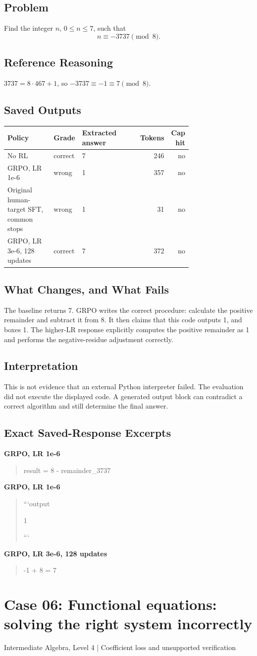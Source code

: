 \documentclass[10pt,letterpaper]{article}
\begin{document}
\subsection*{Problem}
Find the integer $n$, $0 \le n \le 7$, such that \[n \equiv -3737 \pmod{8}.\]
\subsection*{Reference Reasoning}
$3737=8\cdot467+1$, so $-3737\equiv-1\equiv7\pmod8$.
\subsection*{Saved Outputs}
\small\begin{longtable}{p{0.29\linewidth}p{0.10\linewidth}p{0.35\linewidth}rr}\toprule Policy & Grade & Extracted answer & Tokens & Cap hit\\\midrule
No RL & correct & 7 & 246 & no\\
GRPO, LR 1e-6 & wrong & 1 & 357 & no\\
Original human-target SFT, common stops & wrong & 1 & 31 & no\\
GRPO, LR 3e-6, 128 updates & correct & 7 & 372 & no\\
\bottomrule\end{longtable}\normalsize
\subsection*{What Changes, and What Fails}
The baseline returns 7. GRPO writes the correct procedure: calculate the positive remainder and subtract it from 8. It then claims that this code outputs 1, and boxes 1. The higher-LR response explicitly computes the positive remainder as 1 and performs the negative-residue adjustment correctly.
\subsection*{Interpretation}
This is not evidence that an external Python interpreter failed. The evaluation did not execute the displayed code. A generated output block can contradict a correct algorithm and still determine the final answer.
\subsection*{Exact Saved-Response Excerpts}
\textbf{GRPO, LR 1e-6}
\begin{quote}\small\raggedright result = 8 - remainder\_3737\end{quote}
\textbf{GRPO, LR 1e-6}
\begin{quote}\small\raggedright ```output\par 1\par ```\end{quote}
\textbf{GRPO, LR 3e-6, 128 updates}
\begin{quote}\small\raggedright -1 + 8 = 7\end{quote}
\clearpage\section*{Case 06: Functional equations: solving the right system incorrectly}
Intermediate Algebra, Level 4 | Coefficient loss and unsupported verification
\end{document}

